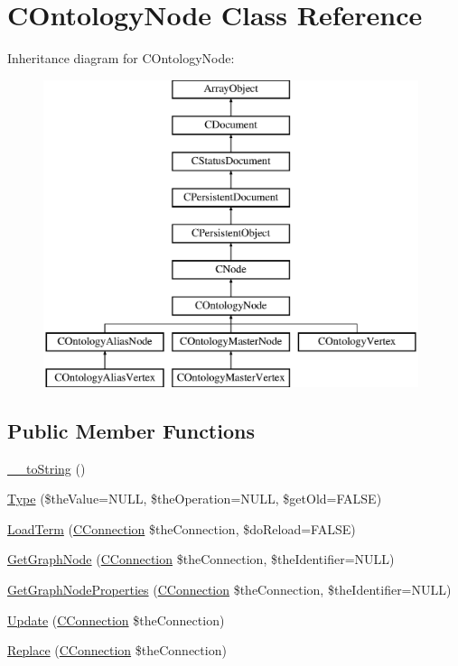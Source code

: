 \hypertarget{class_c_ontology_node}{\section{C\-Ontology\-Node Class Reference}
\label{class_c_ontology_node}
}
Inheritance diagram for C\-Ontology\-Node\-:\begin{figure}[H]
\begin{center}
\leavevmode
\includegraphics[height=9.000000cm]{class_c_ontology_node}
\end{center}
\end{figure}
\subsection*{Public Member Functions}
\begin{DoxyCompactItemize}
\item 
\hyperlink{class_c_ontology_node_ae074c6f51676b4ef5fc3d7fd1c3149af}{\-\_\-\-\_\-to\-String} ()
\item 
\hyperlink{class_c_ontology_node_afc2d00b2e6dd8ecc37d87a593581bc3a}{Type} (\$the\-Value=N\-U\-L\-L, \$the\-Operation=N\-U\-L\-L, \$get\-Old=F\-A\-L\-S\-E)
\item 
\hyperlink{class_c_ontology_node_a09eb3d9d16775d7752fd7bf62dd93d74}{Load\-Term} (\hyperlink{class_c_connection}{C\-Connection} \$the\-Connection, \$do\-Reload=F\-A\-L\-S\-E)
\item 
\hyperlink{class_c_ontology_node_a0dc5644213c5599332a024af2160c9f1}{Get\-Graph\-Node} (\hyperlink{class_c_connection}{C\-Connection} \$the\-Connection, \$the\-Identifier=N\-U\-L\-L)
\item 
\hyperlink{class_c_ontology_node_a8da921e4518e6c9bfc0f2ce6eefe7697}{Get\-Graph\-Node\-Properties} (\hyperlink{class_c_connection}{C\-Connection} \$the\-Connection, \$the\-Identifier=N\-U\-L\-L)
\item 
\hyperlink{class_c_ontology_node_a249a067e22e3d721958903e5b6c36b84}{Update} (\hyperlink{class_c_connection}{C\-Connection} \$the\-Connection)
\item 
\hyperlink{class_c_ontology_node_afc20c775f2ae9e01a2d8e50c95b00baf}{Replace} (\hyperlink{class_c_connection}{C\-Connection} \$the\-Connection)
\end{DoxyCompactItemize}
